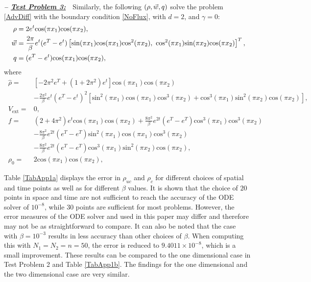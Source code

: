 \textbf{\emph{-- \underline{Test Problem 3:}}}~~Similarly, the following $(\rho,\vec{w},q)$ solve the problem \eqref{AdvDiff} with the boundary condition \eqref{NoFlux}, with $d=2$, and $\gamma =0$:
\begin{align*}
\ \rho={}&2e^{t}\text{cos}(\pi{}x_1)\text{cos}(\pi{}x_2), \\
\ \vec{w}={}&\frac{2\pi}{\beta}e^{t}(e^{T}-e^{t})\left[\text{sin}(\pi{}x_1)\text{cos}(\pi{}x_1)\text{cos}^2(\pi{}x_2),~\text{cos}^2(\pi{}x_1)\text{sin}(\pi{}x_2)\text{cos}(\pi{}x_2)\right]^T, \\
\ \adj={}&(e^{T}-e^{t})\text{cos}(\pi{}x_1)\text{cos}(\pi{}x_2),
\end{align*}
where
\begin{align*}
\ \widehat{\rho}={}&\left[-2\pi^2{}e^{T}+(1+2\pi^2)e^{t}\right]\text{cos}(\pi{}x_1)\text{cos}(\pi{}x_2) \\
\ &-\frac{2\pi^2}{\beta}e^{t}(e^{T}-e^{t})^2\left[\text{sin}^2(\pi{}x_1)\text{cos}(\pi{}x_1)\text{cos}^3(\pi{}x_2)+\text{cos}^3(\pi{}x_1)\text{sin}^2(\pi{}x_2)\text{cos}(\pi{}x_2)\right], \\
\ V_{\text{ext}}={}&0, \\
\ f={}&(2+4\pi^2)e^{t}\text{cos}(\pi{}x_1)\text{cos}(\pi{}x_2)+\frac{8\pi^2}{\beta}e^{2t}(e^{T}-e^{T})\text{cos}^3(\pi{}x_1)\text{cos}^3(\pi{}x_2) \\
\ &-\frac{8\pi^2}{\beta}e^{2t}(e^{T}-e^{T})\text{sin}^2(\pi{}x_1)\text{cos}(\pi{}x_1)\text{cos}^3(\pi{}x_2) \\
\ &-\frac{8\pi^2}{\beta}e^{2t}(e^{T}-e^{T})\text{cos}^3(\pi{}x_1)\text{sin}^2(\pi{}x_2)\text{cos}(\pi{}x_2), \\
\ \rho_{0}={}&2\text{cos}(\pi{}x_1)\text{cos}(\pi{}x_2),
\end{align*}


Table \ref{TabApp1a} displays the error in $\rho_{uc}$ and $\rho_c$ for different choices of spatial and time points as well as for different $\beta$ values. It is shown that the choice of $20$ points in space and time are not sufficient to reach the accuracy of the ODE solver of $10^{-8}$, while $30$ points are sufficient for most problems. However, the error measures of the ODE solver and used in this paper may differ and therefore may not be as straightforward to compare. It can also be noted that the case with $\beta = 10^{-3}$ results in less accuracy than other choices of $\beta$. When computing this with $N_1 = N_2 = n = 50$, the error is reduced to $9.4011 \times 10^{-8}$, which is a small improvement. These results can be compared to the one dimensional case in Test Problem 2 and Table \ref{TabApp1b}. The findings for the one dimensional and the two dimensional case are very similar.


